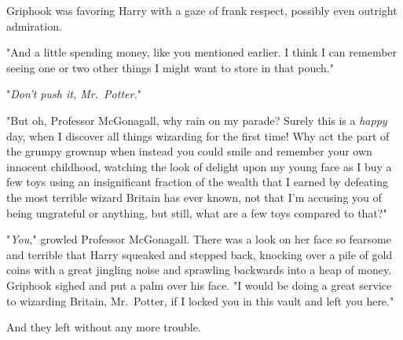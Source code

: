 Griphook was favoring Harry with a gaze of frank respect, possibly even
outright admiration.

"And a little spending money, like you mentioned earlier. I think I can
remember seeing one or two other things I might want to store in that pouch."

"\emph{Don't push it, Mr.~Potter.}"

"But oh, Professor McGonagall, why rain on my parade? Surely this is a
\emph{happy} day, when I discover all things wizarding for the first time! Why
act the part of the grumpy grownup when instead you could smile and remember
your own innocent childhood, watching the look of delight upon my young face as
I buy a few toys using an insignificant fraction of the wealth that I earned by
defeating the most terrible wizard Britain has ever known, not that I'm
accusing you of being ungrateful or anything, but still, what are a few toys
compared to that?"

"\emph{You,}" growled Professor McGonagall. There was a look on her face so
fearsome and terrible that Harry squeaked and stepped back, knocking over a
pile of gold coins with a great jingling noise and sprawling backwards into a
heap of money. Griphook sighed and put a palm over his face. "I would be doing
a great service to wizarding Britain, Mr.~Potter, if I locked you in this vault
and left you here."

And they left without any more trouble.
